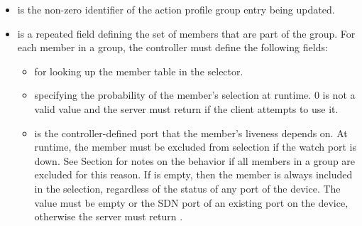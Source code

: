 \documentclass[11pt]{article}
\begin{document}
{\begin{itemize}
\item{}
 is the non-zero  identifier of the action profile group
entry being updated.%

\item{}
 is a repeated field defining the set of members that are part of the
group. For each member in a group, the controller must define the following
fields:%

\begin{itemize}[noitemsep,topsep=\mdcompacttopsep]%

\item{} for looking up the member table in the selector.%

\item{} specifying the probability of the member's selection at
runtime. 0 is not a valid  value and the server must return
 if the client attempts to use it.%

\item{} is the controller-defined port that the member's
liveness depends on. At runtime, the member must be excluded from
selection if the watch port is down.  See Section
 for notes on the behavior if all members in
a group are excluded for this reason. If  is empty, then the
member is always included in the selection, regardless of the status of
any port of the device.  The value must be empty or the SDN port of an
existing port on the device, otherwise the server must return
.%
\end{itemize}%


\end{itemize}}
\end{document}
